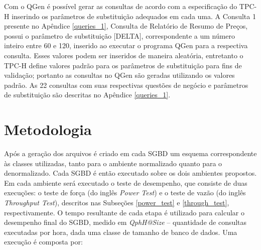 Com o QGen é possível gerar as consultas de acordo com a especificação do TPC-H inserindo os parâmetros de substituição adequados em cada uma. A Consulta 1 presente no Apêndice \ref{queries_1}, Consulta de Relatório de Resumo de Preços, possui o parâmetro de substituição [DELTA], correspondente a um número inteiro entre 60 e 120, inserido ao executar o programa QGen para a respectiva consulta. Esses valores podem ser inseridos de maneira aleatória, entretanto o TPC-H define valores padrão para os parâmetros de substituição para fins de validação; portanto as consultas no QGen são geradas utilizando os valores padrão. As 22 consultas com suas respectivas questões de negócio e parâmetros de substituição são descritas no Apêndice \ref{queries_1}.

\section{Metodologia}
\label{metodologia}

Após a geração dos arquivos é criado em cada SGBD um esquema correspondente às classes utilizadas, tanto para o ambiente normalizado quanto para o denormalizado. Cada SGBD é então executado sobre os dois ambientes propostos. Em cada ambiente será executado o teste de desempenho, que consiste de duas execuções: o teste de força (do inglês \textit{Power Test}) e o teste de vazão (do inglês \textit{Throughput Test}), descritos nas Subseções \ref{power_test} e \ref{through_test}, respectivamente. O tempo resultante de cada etapa é utilizado para calcular o desempenho final do SGBD, medido em \textit{QphH@Size} -- quantidade de consultas executadas por hora, dada uma classe de tamanho de banco de dados. Uma execução é composta por:

